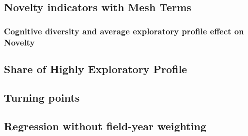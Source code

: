 \clearpage

\subsection*{Novelty indicators with Mesh Terms}
\subsubsection*{Cognitive diversity and average exploratory profile effect on Novelty}



\clearpage
\subsection*{Share of Highly Exploratory Profile}




\clearpage
\subsection*{Turning points}




\newpage
\subsection*{Regression without field-year weighting}








